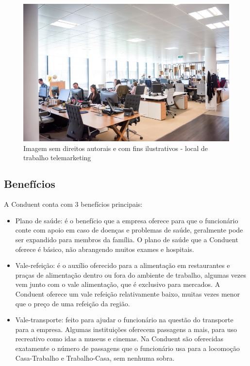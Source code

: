 \documentclass[12pt]{article}
\begin{document}
\begin{figure}[h]
	\centering
	\includegraphics[scale=0.5]{build/images/atendimento.jpg}
	\caption{Imagem sem direitos autorais e com fins ilustrativos - local de trabalho telemarketing}
	\label{fig:mesh1}
\end{figure}

\newpage

\subsection{Benefícios}

A Conduent conta com 3 benefícios principais:



\begin{itemize}
\item Plano de saúde:
\subitem é o benefício que a empresa oferece para que o funcionário conte com apoio em caso de doenças e problemas de saúde, geralmente pode ser expandido para membros da família. O plano de saúde que a Conduent oferece é básico, não abrangendo muitos exames e hospitais.

\item Vale-refeição:
\subitem é o auxílio oferecido para a alimentação em restaurantes e praças de alimentação dentro ou fora do ambiente de trabalho, algumas vezes vem junto com o vale alimentação, que é exclusivo para mercados. A Conduent oferece um vale refeição relativamente baixo, muitas vezes menor que o preço de uma refeição da região.

\item Vale-transporte:
\subitem feito para ajudar o funcionário na questão do transporte para a empresa. Algumas instituições oferecem passagens a mais, para uso recreativo como idas a museus e cinemas. Na Conduent são oferecidas exatamente o número de passagens que o funcionário usa para a locomoção Casa-Trabalho e Trabalho-Casa, sem nenhuma sobra.

\end{itemize}
\end{document}
